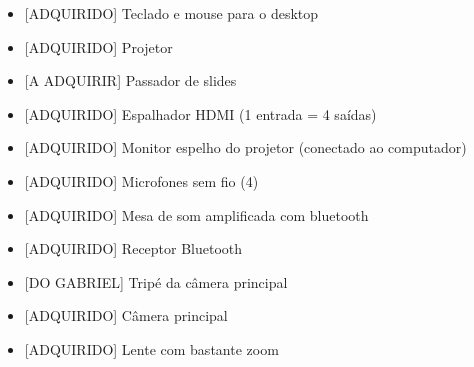 \documentclass[
]{book}
\providecommand{\tightlist}{%
  \setlength{\itemsep}{0pt}\setlength{\parskip}{0pt}}
\begin{document}
\begin{itemize}
\tightlist
\item
  {[}ADQUIRIDO{]} Teclado e mouse para o desktop~
\end{itemize}

\begin{itemize}
\tightlist
\item
  {[}ADQUIRIDO{]} Projetor~
\end{itemize}

\begin{itemize}
\tightlist
\item
  {[}A ADQUIRIR{]} Passador de slides~
\end{itemize}

\begin{itemize}
\tightlist
\item
  {[}ADQUIRIDO{]} Espalhador HDMI (1 entrada = 4 saídas)~
\end{itemize}

\begin{itemize}
\tightlist
\item
  {[}ADQUIRIDO{]} Monitor espelho do projetor (conectado ao computador)~
\end{itemize}

\begin{itemize}
\tightlist
\item
  {[}ADQUIRIDO{]} Microfones sem fio (4)~
\end{itemize}

\begin{itemize}
\tightlist
\item
  {[}ADQUIRIDO{]} Mesa de som amplificada com bluetooth~
\end{itemize}

\begin{itemize}
\tightlist
\item
  {[}ADQUIRIDO{]} Receptor Bluetooth~
\end{itemize}

\begin{itemize}
\tightlist
\item
  {[}DO GABRIEL{]} Tripé da câmera principal~
\end{itemize}

\begin{itemize}
\tightlist
\item
  {[}ADQUIRIDO{]} Câmera principal~
\end{itemize}

\begin{itemize}
\tightlist
\item
  {[}ADQUIRIDO{]} Lente com bastante zoom~
\end{itemize}
\end{document}
